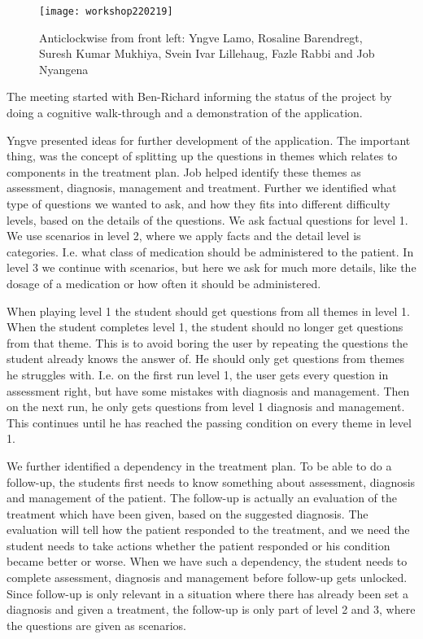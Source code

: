 \begin{figure}[h!]
	\caption {Anticlockwise from front left: Yngve Lamo, Rosaline Barendregt, Suresh Kumar Mukhiya, Svein Ivar Lillehaug, Fazle Rabbi and Job Nyangena}
	\texttt{[image: workshop220219]}
\end{figure}

The meeting started with Ben-Richard informing the status of the project by doing a cognitive walk-through and a demonstration of the application. 

Yngve presented ideas for further development of the application. The important thing, was the concept of splitting up the questions in themes which relates to components in the treatment plan. Job helped identify these themes as assessment, diagnosis, management and treatment. Further we identified what type of questions we wanted to ask, and how they fits into different difficulty levels, based on the details of the questions. We ask factual questions for level 1. We use scenarios in level 2, where we apply facts and the detail level is categories. I.e. what class of medication should be administered to the patient. In level 3 we continue with scenarios, but here we ask for much more details, like the dosage of a medication or how often it should be administered.

When playing level 1 the student should get questions from all themes in level 1. When the student completes level 1, the student should no longer get questions from that theme. This is to avoid boring the user by repeating the questions the student already knows the answer of. He should only get questions from themes he struggles with. I.e. on the first run level 1, the user gets every question in assessment right, but have some mistakes with diagnosis and management. Then on the next run, he only gets questions from level 1 diagnosis and management. This continues until he has reached the passing condition on every theme in level 1. 

We further identified a dependency in the treatment plan. To be able to do a follow-up, the students first needs to know something about assessment, diagnosis and management of the patient. The follow-up is actually an evaluation of the treatment which have been given, based on the suggested diagnosis. The evaluation will tell how the patient responded to the treatment, and we need the student needs to take actions whether the patient responded or his condition became better or worse. When we have such a dependency, the student needs to complete assessment, diagnosis and management before follow-up gets unlocked. Since follow-up is only relevant in a situation where there has already been set a diagnosis and given a treatment, the follow-up is only part of level 2 and 3, where the questions are given as scenarios.

